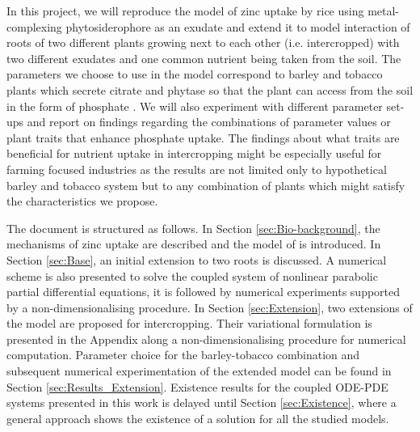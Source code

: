 \documentclass[11pt]{article}
\numberwithin{equation}{section}
\begin{document}
In this project, we will reproduce the model of zinc uptake by rice using metal-complexing phytosidero\-phore as an exudate \cite{Ptashnyk-2011} and extend it to model interaction of roots of two different plants growing next to each other (i.e. intercropped) with two different exudates and one common nutrient being taken from the soil. The parameters we choose to use in the model correspond to barley and tobacco plants which secrete citrate and phytase so that the plant can access  from the soil in the form of phosphate \cite{giles_richardson2018}. We will also experiment with different parameter set-ups and report on findings regarding the combinations of parameter values or plant traits that enhance phosphate uptake. The findings about what traits are beneficial for nutrient uptake in intercropping might be especially useful for farming focused industries as the results are not limited only to hypothetical barley and tobacco system but to any combination of plants which might satisfy the characteristics we propose. 

The document is structured as follows. In Section \ref{sec:Bio-background}, the mechanisms of zinc uptake are described and the model of \cite{Ptashnyk-2011} is introduced. 
In Section \ref{sec:Base}, an initial extension to two roots is discussed. A numerical scheme is also presented to solve the coupled system of nonlinear parabolic partial differential equations, it is followed by numerical experiments supported by a non-dimensionalising procedure. In Section \ref{sec:Extension}, two extensions of the model are proposed for intercropping. Their variational formulation is presented in the Appendix along a non-dimensionalising procedure for numerical computation. Parameter choice for the barley-tobacco combination and subsequent numerical experimentation of the extended model can be found in Section \ref{sec:Results_Extension}. Existence results for the coupled ODE-PDE systems presented in this work is delayed until Section \ref{sec:Existence}, where a general approach shows the existence of a solution for all the studied models.
\end{document}
